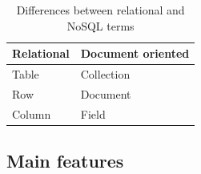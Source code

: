 \begin{table}
\begin{center}
\begin{tabular}{|l|l|}
\hline
\textbf{Relational} & \textbf{Document oriented} \\ 
\hline
Table & Collection\\
\hline
Row & Document\\
\hline
Column & Field \\
\hline
\end{tabular}
\end{center}
\caption{Differences between relational and NoSQL terms}
\end{table}




\subsection{Main features}

